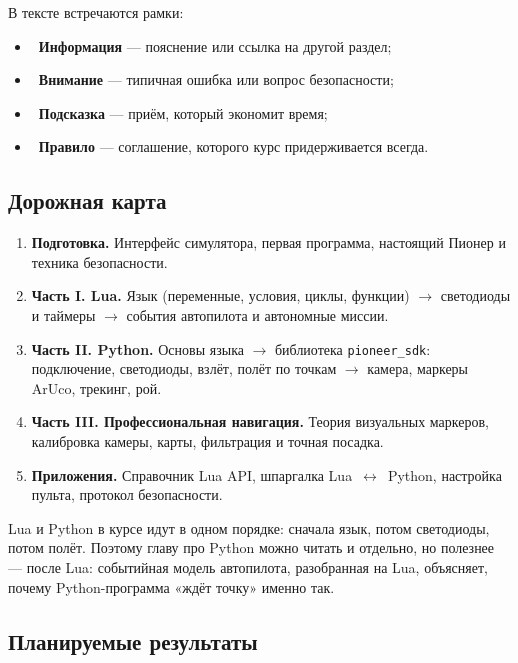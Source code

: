 В тексте встречаются рамки:
\begin{itemize}
    \item \textcolor{GeoskanBlue}{\faInfoCircle}~\textbf{Информация} --- пояснение или ссылка на другой раздел;
    \item \textcolor{red!70!black}{\faExclamationTriangle}~\textbf{Внимание} --- типичная ошибка или вопрос безопасности;
    \item \textcolor{GeoskanOrange}{\faLightbulb}~\textbf{Подсказка} --- приём, который экономит время;
    \item \textcolor{GeoskanDarkBlue}{\faGavel}~\textbf{Правило} --- соглашение, которого курс придерживается всегда.
\end{itemize}

\subsection*{Дорожная карта}

\begin{enumerate}
    \item \textbf{Подготовка.} Интерфейс симулятора, первая программа, настоящий Пионер и техника безопасности.
    \item \textbf{Часть I. Lua.} Язык (переменные, условия, циклы, функции) $\to$ светодиоды и таймеры $\to$ события автопилота и автономные миссии.
    \item \textbf{Часть II. Python.} Основы языка $\to$ библиотека \texttt{pioneer\_sdk}: подключение, светодиоды, взлёт, полёт по точкам $\to$ камера, маркеры ArUco, трекинг, рой.
    \item \textbf{Часть III. Профессиональная навигация.} Теория визуальных маркеров, калибровка камеры, карты, фильтрация и точная посадка.
    \item \textbf{Приложения.} Справочник Lua API, шпаргалка Lua~$\leftrightarrow$~Python, настройка пульта, протокол безопасности.
\end{enumerate}

Lua и Python в курсе идут в одном порядке: сначала язык, потом светодиоды, потом полёт. Поэтому главу про Python можно читать и отдельно, но полезнее --- после Lua: событийная модель автопилота, разобранная на Lua, объясняет, почему Python-программа «ждёт точку» именно так.

\subsection*{Планируемые результаты}


